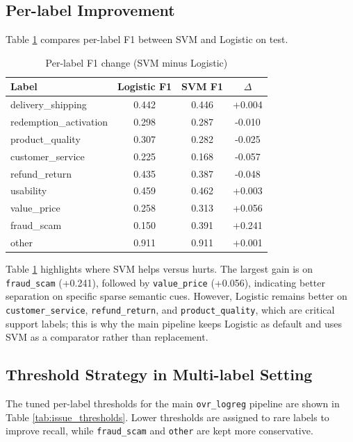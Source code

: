 \documentclass[12pt,a4paper]{article}
\begin{document}
\subsection{Per-label Improvement}
Table \ref{tab:issue_delta} compares per-label F1 between SVM and Logistic on test.

\begin{table}[H]
\centering
\caption{Per-label F1 change (SVM minus Logistic)}
\label{tab:issue_delta}
\begin{tabular}{lccc}
\toprule
Label & Logistic F1 & SVM F1 & $\Delta$ \\
\midrule
delivery\_shipping & 0.442 & 0.446 & +0.004 \\
redemption\_activation & 0.298 & 0.287 & -0.010 \\
product\_quality & 0.307 & 0.282 & -0.025 \\
customer\_service & 0.225 & 0.168 & -0.057 \\
refund\_return & 0.435 & 0.387 & -0.048 \\
usability & 0.459 & 0.462 & +0.003 \\
value\_price & 0.258 & 0.313 & +0.056 \\
fraud\_scam & 0.150 & 0.391 & +0.241 \\
other & 0.911 & 0.911 & +0.001 \\
\bottomrule
\end{tabular}
\end{table}

Table \ref{tab:issue_delta} highlights where SVM helps versus hurts. The largest gain is on \texttt{fraud\_scam} (+0.241), followed by \texttt{value\_price} (+0.056), indicating better separation on specific sparse semantic cues. However, Logistic remains better on \texttt{customer\_service}, \texttt{refund\_return}, and \texttt{product\_quality}, which are critical support labels; this is why the main pipeline keeps Logistic as default and uses SVM as a comparator rather than replacement.

\subsection{Threshold Strategy in Multi-label Setting}
The tuned per-label thresholds for the main \texttt{ovr\_logreg} pipeline are shown in Table \ref{tab:issue_thresholds}. Lower thresholds are assigned to rare labels to improve recall, while \texttt{fraud\_scam} and \texttt{other} are kept more conservative.
\end{document}

